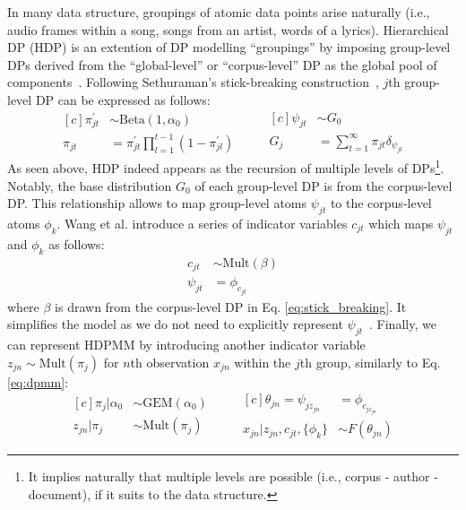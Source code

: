 \documentclass{article}
\begin{document}
In many data structure, groupings of atomic data points arise naturally (i.e., audio frames within a song, songs from an artist, words of a lyrics). Hierarchical DP (HDP) is an extention of DP modelling ``groupings'' by imposing group-level DPs derived from the ``global-level'' or ``corpus-level'' DP as the global pool of components~\cite{doi:10.1198/016214506000000302}. Following Sethuraman's stick-breaking construction~\cite{DBLP:journals/jmlr/WangPB11}, $j$th group-level DP can be expressed as follows:
\begin{equation}\label{eq:hdp_doc_level}
\begin{aligned}[c]
    \pi^{\prime}_{jt} &\sim \text{Beta}(1, \alpha_{0}) \\
    \pi_{jt} &= \pi^{\prime}_{jt} \prod^{t - 1}_{l = 1} (1 - \pi^{\prime}_{jl})
\end{aligned}
\qquad
\begin{aligned}[c]
    \psi_{jt} &\sim G_{0} \\
    G_{j} &= \sum^{\infty}_{t = 1} \pi_{jt}\delta_{\psi_{jt}}
\end{aligned}
\end{equation}
As seen above, HDP indeed appears as the recursion of multiple levels of DPs\footnote{It implies naturally that multiple levels are possible (i.e., corpus - author - document), if it suits to the data structure.}. Notably, the base distribution $G_{0}$ of each group-level DP is from the corpus-level DP. This relationship allows to map group-level atoms $\psi_{jt}$ to the corpus-level atoms $\phi_{k}$. Wang et al. introduce a series of indicator variables $c_{jt}$ which maps $\psi_{jt}$ and $\phi_{k}$ as follows\cite{DBLP:journals/jmlr/WangPB11}:
\begin{equation}\label{eq:psi2phi}
\begin{aligned}
    c_{jt} &\sim \text{Mult}(\beta) \\
    \psi_{jt} &= \phi_{c_{jt}}
\end{aligned}
\end{equation}
where $\beta$ is drawn from the corpus-level DP in Eq. \ref{eq:stick_breaking}. It simplifies the model as we do not need to explicitly represent $\psi_{jt}$~\cite{DBLP:journals/jmlr/WangPB11}.
Finally, we can represent HDPMM by introducing another indicator variable $z_{jn} \sim \text{Mult}(\pi_{j})$ for $n$th observation $x_{jn}$ within the $j$th group, similarly to Eq. \ref{eq:dpmm}:
\begin{equation}\label{eq:hdpmm}
\begin{aligned}[c]
    \pi_{j}|\alpha_{0} &\sim \text{GEM}(\alpha_{0}) \\
    z_{jn}|\pi_{j} &\sim \text{Mult}(\pi_{j})
\end{aligned}
\qquad
\begin{aligned}[c]
    \theta_{jn} = \psi_{jz_{jn}} &= \phi_{c_{jz_{jn}}}  \\
    x_{jn}|z_{jn}, c_{jt}, \{\phi_{k}\} &\sim F(\theta_{jn}) 
\end{aligned}
\end{equation}
\end{document}
